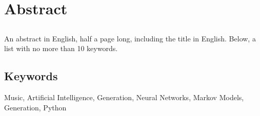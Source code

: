 \chapter*{Abstract}

\section*{\tituloPortadaEngVal}

An abstract in English, half a page long, including the title in English. Below, a list with no more than 10 keywords.


\section*{Keywords}

\noindent Music, Artificial Intelligence, Generation, Neural Networks, Markov Models, Generation, Python



